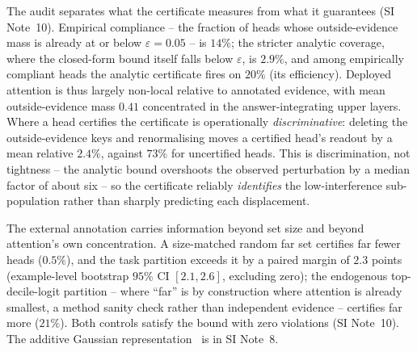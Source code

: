 \documentclass[10pt,twocolumn]{article}
\begin{document}
The audit separates what the certificate measures from what it guarantees (SI Note~10). Empirical compliance -- the fraction of heads whose outside-evidence mass is already at or below $\varepsilon=0.05$ -- is $14\%$; the stricter analytic coverage, where the closed-form bound itself falls below $\varepsilon$, is $2.9\%$, and among empirically compliant heads the analytic certificate fires on $20\%$ (its efficiency). Deployed attention is thus largely non-local relative to annotated evidence, with mean outside-evidence mass $0.41$ concentrated in the answer-integrating upper layers. Where a head certifies the certificate is operationally \emph{discriminative}: deleting the outside-evidence keys and renormalising moves a certified head's readout by a mean relative $2.4\%$, against $73\%$ for uncertified heads. This is discrimination, not tightness -- the analytic bound overshoots the observed perturbation by a median factor of about six -- so the certificate reliably \emph{identifies} the low-interference sub-population rather than sharply predicting each displacement.

The external annotation carries information beyond set size and beyond attention's own concentration. A size-matched random far set certifies far fewer heads ($0.5\%$), and the task partition exceeds it by a paired margin of $2.3$ points (example-level bootstrap $95\%$ CI $[2.1,2.6]$, excluding zero); the endogenous top-decile-logit partition -- where ``far'' is by construction where attention is already smallest, a method sanity check rather than independent evidence -- certifies far more ($21\%$). Both controls satisfy the bound with zero violations (SI Note~10). The additive Gaussian representation~\cite{tsai2019,choromanski2021} is in SI Note~8.
\end{document}
